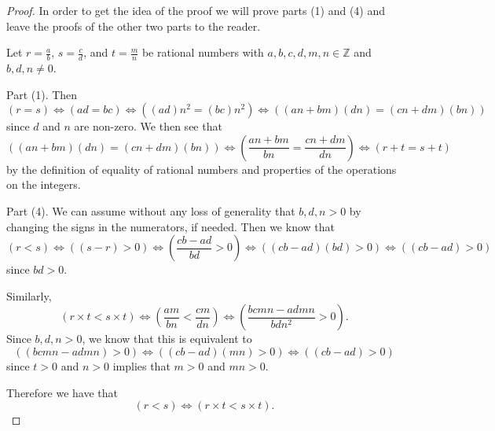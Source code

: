 \documentclass[
]{book}
\theoremstyle{definition}
\theoremstyle{definition}
\theoremstyle{definition}
\theoremstyle{definition}
\theoremstyle{remark}
\begin{document}
\begin{proof}

In order to get the idea of the proof we will prove parts (1) and (4) and leave the proofs of the other two parts to the reader.

Let \(r=\frac{a}{b}\), \(s=\frac{c}{d}\), and \(t=\frac{m}{n}\) be rational numbers with \(a,b,c,d,m,n\in \mathbb{Z}\) and \(b,d,n\neq 0\).

Part (1). Then \[(r=s) \Leftrightarrow (ad=bc) \Leftrightarrow \left( (ad)n^2 = (bc) n^2 \right) \Leftrightarrow \left( (an+bm)(dn)=(cn+dm)(bn) \right) \] since \(d\) and \(n\) are non-zero. We then see that
\[\left( (an+bm)(dn)=(cn+dm)(bn) \right) \Leftrightarrow \left(\frac{an+bm}{bn} = \frac{cn+dm}{dn}\right) \Leftrightarrow  (r+t=s+t)\] by the definition of equality of rational numbers and properties of the operations on the integers.

Part (4). We can assume without any loss of generality that \(b,d,n >0\) by changing the signs in the numerators, if needed. Then we know that \[ (r<s) \Leftrightarrow ((s-r)>0 ) \Leftrightarrow \left( \frac{cb-ad}{bd} >0 \right) \Leftrightarrow \left( (cb-ad)(bd) >0\right) \Leftrightarrow \left( (cb-ad) >0\right)\] since \(bd>0\).

Similarly, \[\left( r\times t < s\times t\right) \Leftrightarrow \left( \frac{am}{bn} < \frac{cm}{dn} \right) \Leftrightarrow \left( \frac{bcmn - admn}{bdn^2} >0\right). \] Since \(b,d,n >0\), we know that this is equivalent to
\[\left( (bcmn-admn)>0 \right) \Leftrightarrow \left( (cb-ad)(mn) > 0 \right) \Leftrightarrow \left( (cb-ad) >0 \right)\] since \(t>0\) and \(n>0\) implies that \(m>0\) and \(mn>0\).

Therefore we have that \[(r<s) \Leftrightarrow \left( r\times t < s\times t\right).\]

\end{proof}
\end{document}
